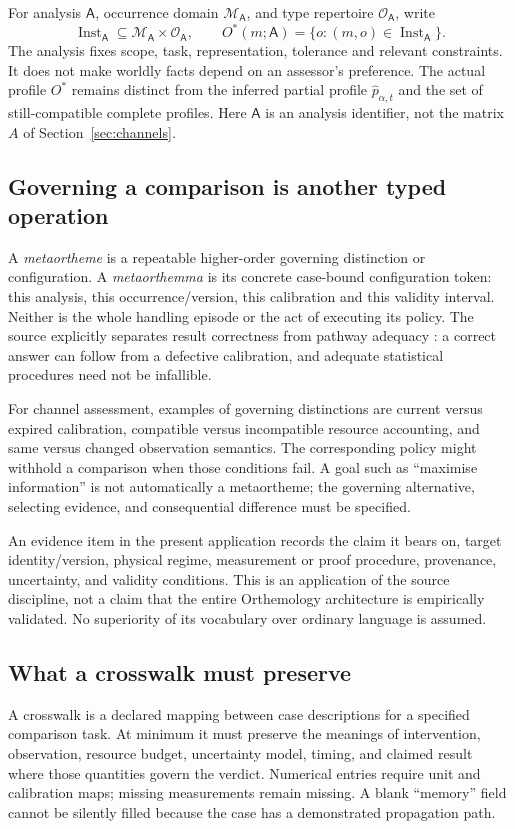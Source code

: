 \documentclass[11pt,a4paper]{article}
\theoremstyle{definition}
\theoremstyle{remark}
\begin{document}
For analysis $\mathsf A$, occurrence domain $\mathcal M_{\mathsf A}$, and type repertoire $\mathcal O_{\mathsf A}$, write
\begin{equation}\label{eq:orthemicprofile}
 \operatorname{Inst}_{\mathsf A}\subseteq
 \mathcal M_{\mathsf A}\times\mathcal O_{\mathsf A},\qquad
 O^*(m;\mathsf A)=\{o:(m,o)\in\operatorname{Inst}_{\mathsf A}\}.
\end{equation}
The analysis fixes scope, task, representation, tolerance and relevant constraints. It does not make worldly facts depend on an assessor's preference. The actual profile $O^*$ remains distinct from the inferred partial profile $\hat p_{\alpha,t}$ and the set of still-compatible complete profiles. Here $\mathsf A$ is an analysis identifier, not the matrix $A$ of Section~\ref{sec:channels}.

\subsection{Governing a comparison is another typed operation}
A \emph{metaortheme} is a repeatable higher-order governing distinction or configuration. A \emph{metaorthemma} is its concrete case-bound configuration token: this analysis, this occurrence/version, this calibration and this validity interval. Neither is the whole handling episode or the act of executing its policy. The source explicitly separates result correctness from pathway adequacy \citep{orthemology}: a correct answer can follow from a defective calibration, and adequate statistical procedures need not be infallible.

For channel assessment, examples of governing distinctions are current versus expired calibration, compatible versus incompatible resource accounting, and same versus changed observation semantics. The corresponding policy might withhold a comparison when those conditions fail. A goal such as ``maximise information'' is not automatically a metaortheme; the governing alternative, selecting evidence, and consequential difference must be specified.

An evidence item in the present application records the claim it bears on, target identity/version, physical regime, measurement or proof procedure, provenance, uncertainty, and validity conditions. This is an application of the source discipline, not a claim that the entire Orthemology architecture is empirically validated. No superiority of its vocabulary over ordinary language is assumed.

\subsection{What a crosswalk must preserve}
A crosswalk is a declared mapping between case descriptions for a specified comparison task. At minimum it must preserve the meanings of intervention, observation, resource budget, uncertainty model, timing, and claimed result where those quantities govern the verdict. Numerical entries require unit and calibration maps; missing measurements remain missing. A blank ``memory'' field cannot be silently filled because the case has a demonstrated propagation path.
\end{document}
